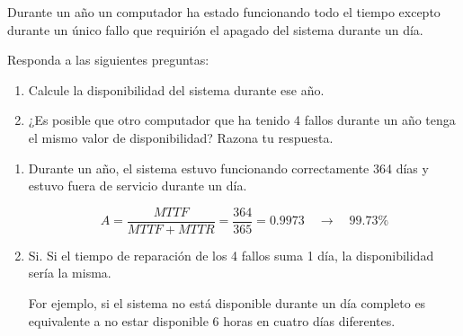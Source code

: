 \begin{acexercise}\end{acexercise}

Durante un año un computador ha estado funcionando todo el tiempo excepto
durante un único fallo que requirión el apagado del sistema durante un día.

Responda a las siguientes preguntas:

\begin{enumerate}

  \item Calcule la disponibilidad del sistema durante ese año.

  \item ¿Es posible que otro computador que ha tenido 4 fallos durante un año
        tenga el mismo valor de disponibilidad? Razona tu respuesta.

\end{enumerate}

\begin{acsolution}\end{acsolution}

\begin{enumerate}

\item

Durante un año, el sistema estuvo funcionando correctamente 364 días y estuvo
fuera de servicio durante un día.

\[
A = \frac{MTTF}{MTTF + MTTR} = \frac{364}{365} = 0.9973 \quad
\rightarrow \quad 99.73\%
\]

\item

Si. Si el tiempo de reparación de los 4 fallos suma 1 día, la disponibilidad sería la misma.

For ejemplo, si el sistema no está disponible durante un día completo
es equivalente a no estar disponible 6 horas en cuatro días diferentes.

\end{enumerate}
